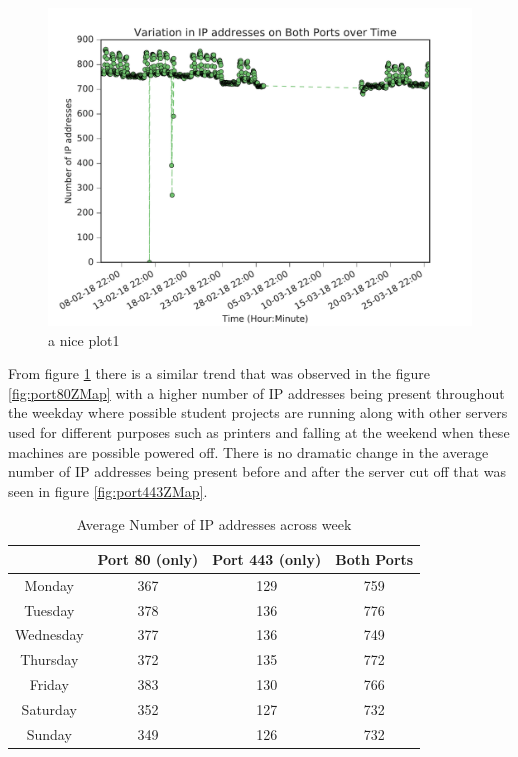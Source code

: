 \documentclass[a4wide,leqno,12pt]{report}
\begin{document}
\begin{figure}[H]
\centering
\includegraphics[scale=.5]{pdf_images/VariationInIpAddressesOnBothPortsOverTime}
\caption{a nice plot1}
\label{fig:portsBothZMap}
\end{figure}
From figure \ref{fig:portsBothZMap} there is a similar trend that was observed in the figure \ref{fig:port80ZMap} with a higher number of IP addresses being present throughout the weekday where possible student projects are running along with other servers used for different purposes such as printers and falling at the weekend when these machines are possible powered off. There is no dramatic change in the average number of IP addresses being present before and after the server cut off that was seen in figure \ref{fig:port443ZMap}.

\begin{table}[H]
\centering
\begin{tabular}{||c c c c ||}
 \hline
  & Port 80 (only) & Port 443 (only) & Both Ports \\ [0.5ex]
 \hline\hline
 Monday & 367 & 129 & 759  \\
 Tuesday & 378 & 136 & 776 \\
 Wednesday & 377 & 136 & 749 \\
 Thursday & 372 & 135 & 772  \\
 Friday & 383 & 130 & 766 \\
 Saturday & 352 & 127 & 732\\
 Sunday & 349 & 126 & 732\\[1ex]
 \hline
\end{tabular}
\caption{Average Number of IP addresses across week}
\label{table:1}
\end{table}
\end{document}
